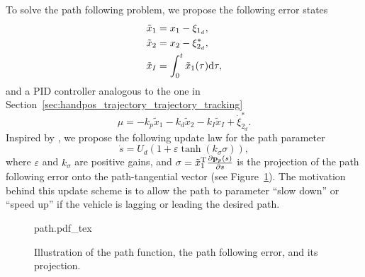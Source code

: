 To solve the path following problem, we propose the following error states
\begin{subequations}
    \begin{align}
        \tilde{x}_1 &= x_1 - \xi_{1_d}, \\
        \tilde{x}_2 &= x_2 - \xi_{2_d}^{*}, \\
        \tilde{x}_I &= \int_{0}^t \tilde{x}_1(\tau) {\rm d}\tau,
    \end{align}
\end{subequations}
and a PID controller analogous to the one in Section~\ref{sec:handpos_trajectory_trajectory_tracking}
\begin{equation}
    \mu = -k_p\tilde{x}_1 - k_d\tilde{x}_2 - k_I\tilde{x}_I + \dot{\xi}_{2_d}^{*}.
\end{equation}
Inspired by \cite{belleter_2019_observer}, we propose the following update law for the path parameter 
\begin{equation}
    \dot{s} = U_d\left(1 + \varepsilon\tanh\left(k_{\sigma}\sigma\right)\right), \label{eq:handpos_trajectory_s_dot}
\end{equation}
where $\varepsilon$ and $k_{\sigma}$ are positive gains, and $\sigma = \tilde{x}_1^{\mathrm{T}} \frac{\partial \mathbf{p}_p(s)}{\partial s}$ is the projection of the path following error onto the path-tangential vector (see Figure~\ref{fig:path}).
The motivation behind this update scheme is to allow the path to parameter ``slow down'' or ``speed up'' if the vehicle is lagging or leading the desired path.

\begin{figure}[b]
    \centering
    \def\svgwidth{0.4 \textwidth}
    {path.pdf_tex}
    \vspace*{-4mm}
    \caption{Illustration of the path function, the path following error, and its projection.}
    \label{fig:path}
\end{figure}

